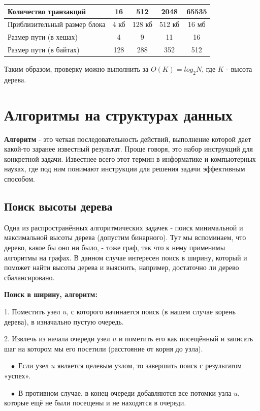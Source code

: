\documentclass[utf8,14pt,a4paper,oneside,russian]{book}
\begin{document}
	\begin{longtable}{l|c|c|c|c}
		Количество транзакций&16&512&2048&65535\\\hline
		Приблизительный размер блока&4 кб&128 кб& 512 кб&16 мб\\\hline
		Размер пути (в хешах)&4&9&11&16\\\hline
		Размер пути (в байтах)&128&288&352&512\\
	\end{longtable}

	Таким образом, проверку можно выполнить за $O(K)=log_2N$, где $K$ - высота дерева.
	
	\newpage
	\section{Алгоритмы на структурах данных}
	
	\textbf{Алгоритм} - это четкая последовательность действий, выполнение которой дает какой-то заранее известный результат. Проще говоря, это набор инструкций для конкретной задачи. Известнее всего этот термин в информатике и компьютерных науках, где под ним понимают инструкции для решения задачи эффективным способом.
	
	\subsection{Поиск высоты дерева}
	
	Одна из распространённых алгоритмических задачек - поиск минимальной и максимальной высоты дерева (допустим бинарного). Тут мы вспоминаем, что дерево, какое бы оно ни было, - тоже граф, так что к нему применимы алгоритмы на графах. В данном случае интересен поиск в ширину, который и поможет найти высоты дерева и выяснить, например, достаточно ли дерево сбалансировано.
	
	\textbf{Поиск в ширину, алгоритм:}
	
	1. Поместить узел $u$, с которого начинается поиск (в нашем случае корень дерева), в изначально пустую очередь.
	
	2. Извлечь из начала очереди узел $u$ и пометить его как посещённый и записать шаг на котором мы его посетили (расстояние от корня до узла).
	
	$\; \; \; \bullet$ Если узел $u$ является целевым узлом, то завершить поиск с результатом «успех».
	
	$\; \; \; \bullet$ В противном случае, в конец очереди добавляются все потомки узла $u$, которые ещё не были посещены и не находятся в очереди.
	
\end{document}
